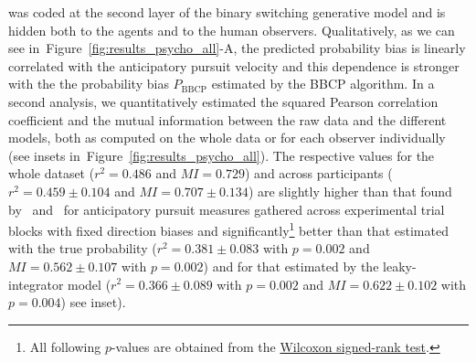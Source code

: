 \documentclass[10pt,letterpaper]{article}
\newcommand{\citet}[1]{\cite{#1}}
\newcommand{\seeFig}[1]{Figure~\ref{fig:#1}}
\begin{document}
was coded at the second layer of the binary switching generative model and
is hidden both to the agents and to the human observers.
%
Qualitatively, as we can see in~\seeFig{results_psycho_all}-A,
the predicted probability bias
is linearly correlated with the anticipatory pursuit velocity
and this dependence is stronger with the
the probability bias $P_{\text{BBCP}}$ estimated by the BBCP algorithm.
In a second analysis, we quantitatively estimated the squared Pearson correlation coefficient
and the mutual information
between the raw data and the different models, both as computed on the whole data or
for each observer individually (see insets in~\seeFig{results_psycho_all}).
The respective values for the whole dataset
($r^{2} = 0.486$ and $MI = 0.729$) and across participants
($r^2 = 0.459 \pm 0.104$ and $MI = 0.707 \pm 0.134$)
are slightly higher than that found by~\citet{Montagnini2010} and~\citet{Damasse18}
for anticipatory pursuit measures gathered across experimental trial blocks with fixed direction biases %
and significantly\footnote{All following $p$-values are obtained from the \href{https://docs.scipy.org/doc/scipy/reference/generated/scipy.stats.wilcoxon.html}{Wilcoxon signed-rank test}.} better than that estimated
with the true probability
($r^{2} = 0.381 \pm 0.083$ with $p=0.002$
and $MI = 0.562 \pm 0.107$ with $p=0.002$)
and for that estimated by the leaky-integrator model
($r^{2} = 0.366 \pm 0.089$ with $p=0.002$ and $MI = 0.622 \pm 0.102$ with $p=0.004$)
see inset).
\end{document}
